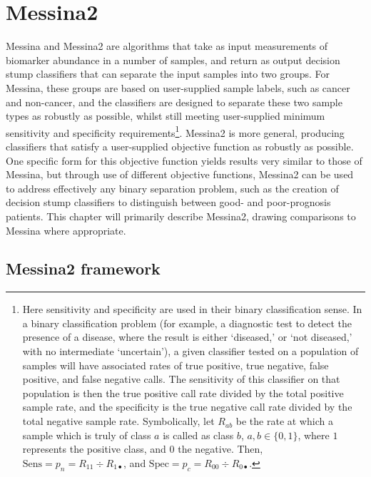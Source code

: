 \documentclass[dissertation.tex]{subfiles}
\begin{document}
\section{Messina2}
Messina and Messina2 are algorithms that take as input measurements of biomarker abundance in a number of samples, and return as output decision stump classifiers that can separate the input samples into two groups.  For Messina, these groups are based on user-supplied sample labels, such as cancer and non-cancer, and the classifiers are designed to separate these two sample types as robustly as possible, whilst still meeting user-supplied minimum sensitivity and specificity requirements\footnote{Here sensitivity and specificity are used in their binary classification sense.  In a binary classification problem (for example, a diagnostic test to detect the presence of a disease, where the result is either `diseased,' or `not diseased,' with no intermediate `uncertain'), a given classifier tested on a population of samples will have associated rates of true positive, true negative, false positive, and false negative calls.  The sensitivity of this classifier on that population is then the true positive call rate divided by the total positive sample rate, and the specificity is the true negative call rate divided by the total negative sample rate.  Symbolically, let $R_{ab}$ be the rate at which a sample which is truly of class $a$ is called as class $b$, $a, b \in \{0,1\}$, where $1$ represents the positive class, and $0$ the negative.  Then, $\mathrm{Sens} = p_n = R_{11} \div R_{1\bullet}$, and $\mathrm{Spec} = p_c = R_{00} \div R_{0\bullet}$.}.  Messina2 is more general, producing classifiers that satisfy a user-supplied objective function as robustly as possible.  One specific form for this objective function yields results very similar to those of Messina, but through use of different objective functions, Messina2 can be used to address effectively any binary separation problem, such as the creation of decision stump classifiers to distinguish between good- and poor-prognosis patients.  This chapter will primarily describe Messina2, drawing comparisons to Messina where appropriate.

\subsection{Messina2 framework}
\end{document}
